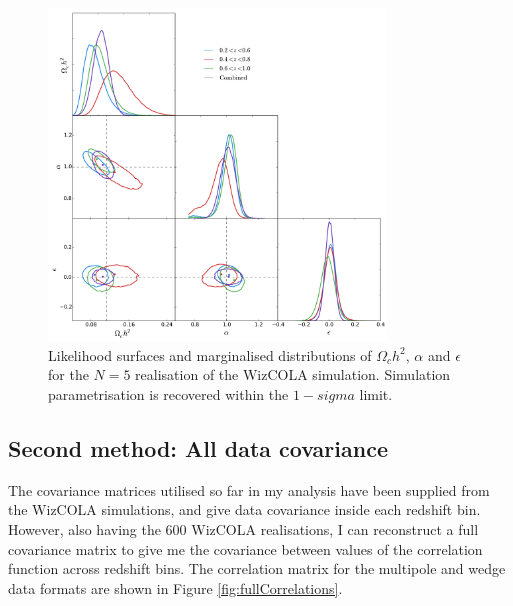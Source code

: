 \documentclass[titlesmallcaps, examinerscopy, copyrightpage]{uqthesis}
\begin{document}
\begin{figure}[h!]
  \begin{center}
    \includegraphics[width=0.8\textwidth]{images/corCombinedMp5.pdf}
  \end{center}
  \caption{Likelihood surfaces and marginalised distributions of $\Omega_ch^2$, $\alpha$ and $\epsilon$ for the $N=5$ realisation of the WizCOLA simulation. Simulation parametrisation is recovered within the $1-sigma$ limit.}
  \label{fig:corCombined_2}
\end{figure}




\subsection{Second method: All data covariance} \label{sec:allData}

The covariance matrices utilised so far in my analysis have been supplied from the WizCOLA simulations, and give data covariance inside each redshift bin. However, also having the 600 WizCOLA realisations, I can reconstruct a full covariance matrix to give me the covariance between values of the correlation function across redshift bins. The correlation matrix for the multipole and wedge data formats are shown in Figure \ref{fig:fullCorrelations}.\\
\end{document}
